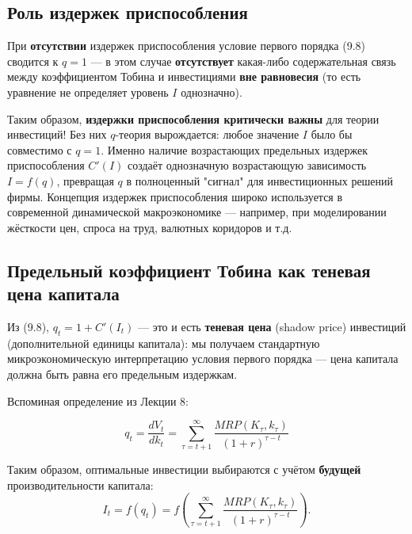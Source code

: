 \documentclass[10pt,a4paper]{article}
\begin{document}
\subsection{Роль издержек приспособления}

При \textbf{отсутствии} издержек приспособления условие первого порядка (9.8) сводится к $q=1$ — в этом случае \textbf{отсутствует} какая-либо содержательная связь между коэффициентом Тобина и инвестициями \textbf{вне равновесия} (то есть уравнение не определяет уровень $I$ однозначно).

\begin{intuition}
Таким образом, \textbf{издержки приспособления критически важны} для теории инвестиций! Без них $q$-теория вырождается: любое значение $I$ было бы совместимо с $q=1$. Именно наличие возрастающих предельных издержек приспособления $C'(I)$ создаёт однозначную возрастающую зависимость $I=f(q)$, превращая $q$ в полноценный "сигнал" для инвестиционных решений фирмы. Концепция издержек приспособления широко используется в современной динамической макроэкономике — например, при моделировании жёсткости цен, спроса на труд, валютных коридоров и т.д.
\end{intuition}

\subsection{Предельный коэффициент Тобина как теневая цена капитала}

Из (9.8), $q_t = 1+C'(I_t)$ — это и есть \textbf{теневая цена} (shadow price) инвестиций (дополнительной единицы капитала): мы получаем стандартную микроэкономическую интерпретацию условия первого порядка — цена капитала должна быть равна его предельным издержкам.

Вспоминая определение из Лекции 8:
\begin{formulabox}
\begin{equation}
q_t = \frac{dV_t}{dk_t} = \sum_{\tau=t+1}^{\infty}\frac{MRP(K_\tau,k_\tau)}{(1+r)^{\tau-t}} \tag{9.10}
\end{equation}
\end{formulabox}

Таким образом, оптимальные инвестиции выбираются с учётом \textbf{будущей} производительности капитала:
\begin{equation}
I_t = f(q_t) = f\left(\sum_{\tau=t+1}^{\infty}\frac{MRP(K_\tau,k_\tau)}{(1+r)^{\tau-t}}\right). \tag{9.9}
\end{equation}
\end{document}
